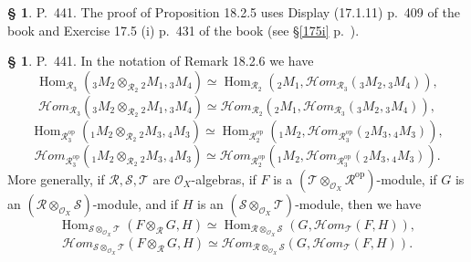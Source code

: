 \documentclass[12pt]{article}%
\theoremstyle{remark}
\theoremstyle{definition}
\newtheorem{s}[thm]{\S}%
\newcommand{\cc}{\mathcal}
\newcommand{\HOM}{\cc H\!\mathit{om}}
\DeclareMathOperator{\Hom}{Hom}%
\DeclareMathOperator{\op}{op}
\begin{document}
% 

\begin{s}
P.~441. The proof of Proposition 18.2.5 uses Display (17.1.11) p.~409 of the book and Exercise 17.5 (i) p.~431 of the book (see \S\ref{175i} p.~\pageref{175i}). 
\end{s} 

% 

\begin{s} 
P.~441. In the notation of Remark 18.2.6 we have 
$$
\Hom_{\cc R_3}({}_3M_2\otimes_{\cc R_2}{}_2M_1,{}_3M_4)\simeq
\Hom_{\cc R_2}({}_2M_1,\HOM_{\cc R_3}({}_3M_2,{}_3M_4)),
$$
$$
\HOM_{\cc R_3}({}_3M_2\otimes_{\cc R_2}{}_2M_1,{}_3M_4)\simeq
\HOM_{\cc R_2}({}_2M_1,\HOM_{\cc R_3}({}_3M_2,{}_3M_4)),
$$ 
$$
\Hom_{\cc R_3^{\op}}({}_1M_2\otimes_{\cc R_2}{}_2M_3,{}_4M_3)\simeq
\Hom_{\cc R_2^{\op}}({}_1M_2,\HOM_{\cc R_3^{\op}}({}_2M_3,{}_4M_3)),
$$ 
$$
\HOM_{\cc R_3^{\op}}({}_1M_2\otimes_{\cc R_2}{}_2M_3,{}_4M_3)\simeq
\HOM_{\cc R_2^{\op}}({}_1M_2,\HOM_{\cc R_3^{\op}}({}_2M_3,{}_4M_3)).
$$ 
More generally, if $\cc{R,S,T}$ are $\cc O_X$-algebras, if $F$ is a $(\cc T\otimes_{\cc O_X}\cc R^{\op})$-module, if $G$ is an $(\cc R\otimes_{\cc O_X}\cc S)$-module, and if $H$ is an $(\cc S\otimes_{\cc O_X}\cc T)$-module, then we have 
$$ 
\Hom_{\cc S\otimes_{\cc O_X}\cc T}(F\otimes_{\cc R}G,H)\simeq
\Hom_{\cc R\otimes_{\cc O_X}\cc S}(G,\HOM_{\cc T}(F,H)), 
$$ 
\begin{equation}\label{HOM}
\HOM_{\cc S\otimes_{\cc O_X}\cc T}(F\otimes_{\cc R}G,H)\simeq
\HOM_{\cc R\otimes_{\cc O_X}\cc S}(G,\HOM_{\cc T}(F,H)). 
\end{equation}
\end{s} 

%
\end{document}
